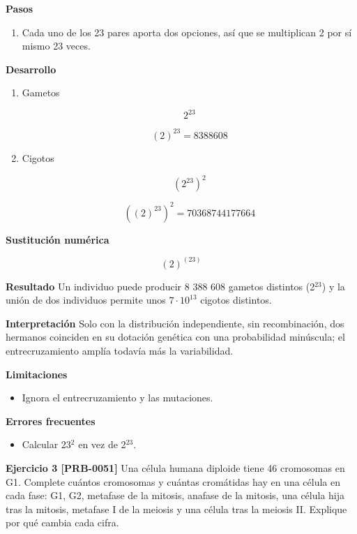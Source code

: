 \documentclass{book}
\begin{document}
\noindent\textbf{Pasos}
\begin{enumerate}
\item
Cada uno de los 23 pares aporta dos opciones, así que se multiplican 2 por sí mismo 23 veces.

\end{enumerate}

\noindent\textbf{Desarrollo}
\begin{enumerate}
\item
Gametos


\[
2^{23}
\]

\[
\left(2\right)^{23} = 8388608
\]
\item
Cigotos


\[
(2^{23})^2
\]

\[
\left(\left(2\right)^{23}\right)^{2} = 70368744177664
\]
\end{enumerate}

\noindent\textbf{Sustitución numérica}

\[
\left(2\right)^{\left(23\right)}
\]

\noindent\textbf{Resultado}
Un individuo puede producir 8 388 608 gametos distintos (2\({}^{23}\)) y la unión de dos individuos permite unos \(7\cdot10^{13}\) cigotos distintos.


\noindent\textbf{Interpretación}
Solo con la distribución independiente, sin recombinación, dos hermanos coinciden en su dotación genética con una probabilidad minúscula; el entrecruzamiento amplía todavía más la variabilidad.


\noindent\textbf{Limitaciones}
\begin{itemize}
\item Ignora el entrecruzamiento y las mutaciones.
\end{itemize}

\noindent\textbf{Errores frecuentes}
\begin{itemize}
\item Calcular 23\({}^{2}\) en vez de 2\({}^{23}\).
\end{itemize}

\noindent\textbf{Ejercicio 3 [PRB-0051]}
Una célula humana diploide tiene 46 cromosomas en G1. Complete cuántos cromosomas y cuántas cromátidas hay en una célula en cada fase: G1, G2, metafase de la mitosis, anafase de la mitosis, una célula hija tras la mitosis, metafase I de la meiosis y una célula tras la meiosis II. Explique por qué cambia cada cifra.
\end{document}
